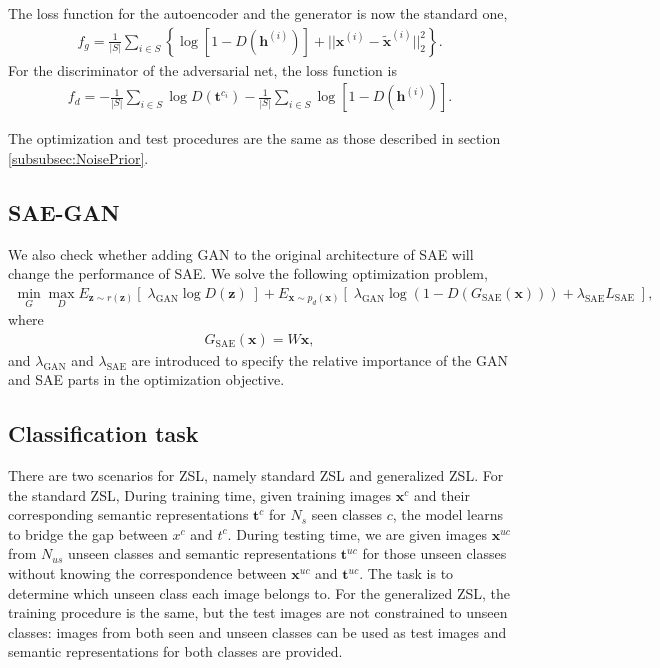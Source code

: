 \documentclass{article}
\newcommand{\bb}[1]{\boldsymbol{#1}}
\begin{document}
	The loss function for the autoencoder and the generator is now the standard one,
	\begin{align}
		f_g = \frac{1}{|S|} \sum_{i \in S} \left\{ \log\left[ 1 - D( \bb{h}^{(i)} ) \right] + || \bb{x}^{(i)} - \tilde{\bb{x}}^{(i)} ||_2^2 \right\}.
	\end{align}
	For the discriminator of the adversarial net, the loss function is
	\begin{align}
		f_d = -\frac{1}{|S|} \sum_{i \in S} \log D( \bb{t}^{c_i} ) - \frac{1}{|S|} \sum_{i \in S} \log\left[ 1 - D( \bb{h}^{(i)} ) \right].
	\end{align}
	
	The optimization and test procedures are the same as those described in section \ref{subsubsec:NoisePrior}.




\subsection{SAE-GAN}

	We also check whether adding GAN to the original architecture of SAE will change the performance of SAE. We solve the following optimization problem,
	\begin{align}
		\min_{G} \max_D E_{\bb{z} \sim r(\bb{z})}\left[\; \lambda_{\textrm{GAN}} \log D(\bb{z}) \;\right] + E_{\bb{x} \sim p_d(\bb{x})}\left[\; \lambda_{\textrm{GAN}} \log( 1 - D(G_{\textrm{SAE}}(\bb{x})) ) + \lambda_{\textrm{SAE}} L_{\textrm{SAE}} \;\right],
	\end{align}
	where
	\begin{align}
		G_{\textrm{SAE}}(\bb{x}) = W \bb{x},
	\end{align}
	and $\lambda_{\textrm{GAN}}$ and $\lambda_{\textrm{SAE}}$ are introduced to specify the relative importance of the GAN and SAE parts in the optimization objective.




\subsection{Classification task}

	There are two scenarios for ZSL, namely standard ZSL and generalized ZSL. For the standard ZSL, During training time, given training images $\bb{x}^c$ and their corresponding semantic representations $\bb{t}^c$ for $N_s$ seen classes $c$, the model learns to bridge the gap between $x^c$ and $t^c$. During testing time, we are given images $\bb{x}^{uc}$ from $N_{us}$ unseen classes and semantic representations $\bb{t}^{uc}$ for those unseen classes without knowing the correspondence between $\bb{x}^{uc}$ and $\bb{t}^{uc}$. The task is to determine which unseen class each image belongs to. For the generalized ZSL, the training procedure is the same, but the test images are not constrained to unseen classes: images from both seen and unseen classes can be used as test images and semantic representations for both classes are provided.
\end{document}
